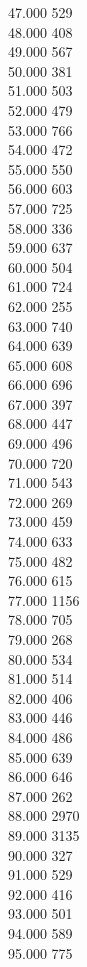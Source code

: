 { 47.000	529 \\
 48.000	408 \\
 49.000	567 \\
 50.000	381 \\
 51.000	503 \\
 52.000	479 \\
 53.000	766 \\
 54.000	472 \\
 55.000	550 \\
 56.000	603 \\
 57.000	725 \\
 58.000	336 \\
 59.000	637 \\
 60.000	504 \\
 61.000	724 \\
 62.000	255 \\
 63.000	740 \\
 64.000	639 \\
 65.000	608 \\
 66.000	696 \\
 67.000	397 \\
 68.000	447 \\
 69.000	496 \\
 70.000	720 \\
 71.000	543 \\
 72.000	269 \\
 73.000	459 \\
 74.000	633 \\
 75.000	482 \\
 76.000	615 \\
 77.000	1156 \\
 78.000	705 \\
 79.000	268 \\
 80.000	534 \\
 81.000	514 \\
 82.000	406 \\
 83.000	446 \\
 84.000	486 \\
 85.000	639 \\
 86.000	646 \\
 87.000	262 \\
 88.000	2970 \\
 89.000	3135 \\
 90.000	327 \\
 91.000	529 \\
 92.000	416 \\
 93.000	501 \\
 94.000	589 \\
 95.000	775 \\
}
